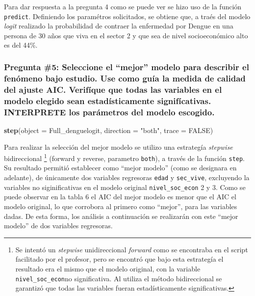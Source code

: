 \documentclass[
]{article}
\newenvironment{Shaded}{\begin{snugshade}}{\end{snugshade}}
\newcommand{\DataTypeTok}[1]{\textcolor[rgb]{0.13,0.29,0.53}{#1}}
\newcommand{\KeywordTok}[1]{\textcolor[rgb]{0.13,0.29,0.53}{\textbf{#1}}}
\newcommand{\NormalTok}[1]{#1}
\newcommand{\OtherTok}[1]{\textcolor[rgb]{0.56,0.35,0.01}{#1}}
\newcommand{\StringTok}[1]{\textcolor[rgb]{0.31,0.60,0.02}{#1}}
\begin{document}
Para dar respuesta a la pregunta 4 como se puede ver se hizo uso de la
función \texttt{predict}. Definiendo los paramétros solicitados, se
obtiene que, a traés del modelo \emph{logit} realizado la probabilidad
de contraer la enfermedad por Dengue en una persona de 30 años que viva
en el sector 2 y que sea de nivel socioeconómico alto es del 44\%.

\hypertarget{pregunta-5-seleccione-el-mejor-modelo-para-describir-el-fenuxf3meno-bajo-estudio.-use-como-guuxeda-la-medida-de-calidad-del-ajuste-aic.-verifuxedque-que-todas-las-variables-en-el-modelo-elegido-sean-estaduxedsticamente-signifuxedcativas.-interprete-los-paruxe1metros-del-modelo-escogido.}{%
\subsubsection{Pregunta \#5: Seleccione el ``mejor'' modelo para
describir el fenómeno bajo estudio. Use como guía la medida de calidad
del ajuste AIC. Verifíque que todas las variables en el modelo elegido
sean estadísticamente signifícativas. INTERPRETE los parámetros del
modelo
escogido.}\label{pregunta-5-seleccione-el-mejor-modelo-para-describir-el-fenuxf3meno-bajo-estudio.-use-como-guuxeda-la-medida-de-calidad-del-ajuste-aic.-verifuxedque-que-todas-las-variables-en-el-modelo-elegido-sean-estaduxedsticamente-signifuxedcativas.-interprete-los-paruxe1metros-del-modelo-escogido.}}

\begin{Shaded}
\begin{Highlighting}[]
\KeywordTok{step}\NormalTok{(}\DataTypeTok{object =}\NormalTok{ Full_denguelogit, }\DataTypeTok{direction =} \StringTok{"both"}\NormalTok{, }\DataTypeTok{trace =} \OtherTok{FALSE}\NormalTok{)}
\end{Highlighting}
\end{Shaded}

Para realizar la selección del mejor modelo se utilizo una estrategía
\emph{stepwise} bidireccional \footnote{Se intentó un \emph{stepwise}
  unidireccional \emph{forward} como se encontraba en el script
  facilitado por el profesor, pero se encontró que bajo esta estrategía
  el resultado era el mismo que el modelo original, con la variable
  \texttt{nivel\_soc\_econ}no significativa. Al utiliza el método
  bidireccional se garantizó que todas las variables fueran
  estadísticamente significativas.} (forward y reverse, parametro
\texttt{both}), a través de la función \texttt{step}. Su resultado
permitió establecer como ``mejor modelo'' (como se designara en
adelante), de únicamente dos variables regresoras \texttt{edad} y
\texttt{sec\_vive}, excluyendo la variables no siginificativas en el
modelo original \texttt{nivel\_soc\_econ} 2 y 3. Como se puede observar
en la tabla 6 el AIC del mejor modelo es menor que el AIC el modelo
original, lo que corrobora al primero como ``mejor'', para las variables
dadas. De esta forma, los análisis a continuación se realizarán con este
``mejor modelo'' de dos variables regresoras.
\end{document}
